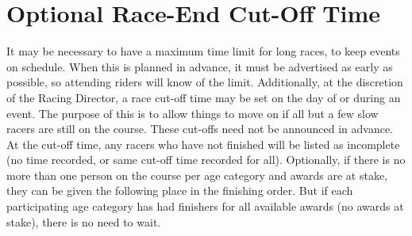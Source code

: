 \section{Optional Race-End Cut-Off Time}
It may be necessary to have a maximum time limit for long races, to keep events on schedule. When this is planned in advance, it must be advertised as early as possible, so attending riders will know of the limit. Additionally, at the discretion of the Racing Director, a race cut-off time may be set on the day of or during an event. The purpose of this is to allow things to move on if all but a few slow racers are still on the course. These cut-offs need not be announced in advance. At the cut-off time, any racers who have not finished will be listed as incomplete (no time recorded, or same cut-off time recorded for all). Optionally, if there is no more than one person on the course per age category and awards are at stake, they can be given the following place in the finishing order. But if each participating age category has had finishers for all available awards (no awards at stake), there is no need to wait.



